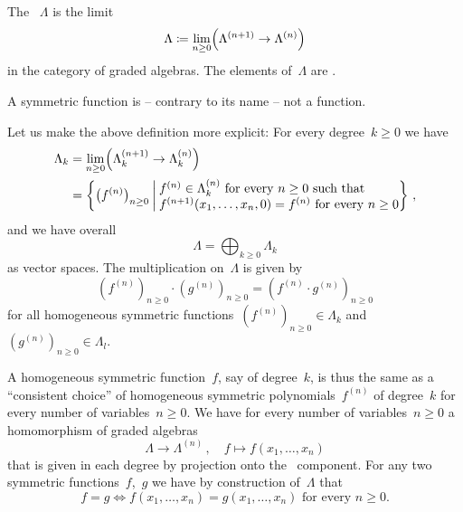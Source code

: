 \documentclass[a4paper,11pt]{scrartcl}
\begin{document}
\begin{definition}
  The ~$\Lambda$ is the limit
  \[
    \Lambda
    \coloneqq
    \lim_{n \geq 0}
    \Bigl( \Lambda^{(n+1)} \to \Lambda^{(n)} \Bigr)
  \]
  in the category of graded algebras.
  The elements of~$\Lambda$ are .
\end{definition}

\begin{warning}
  A symmetric function is -- contrary to its name -- not a function.
\end{warning}

Let us make the above definition more explicit:
For every degree~$k \geq 0$ we have
\begin{align*}
  \Lambda_k
  &=
  \lim_{n \geq 0}
  \Bigl( \Lambda^{(n+1)}_k \to \Lambda^{(n)}_k \Bigr)
  \\
  &=
  \left\{
    \bigl( f^{(n)} \bigr)_{n \geq 0}
    \suchthat*
    \begin{tabular}{@{}l@{}}
      $f^{(n)} \in \Lambda^{(n)}_k$ for every~$n \geq 0$ such that \\
      $f^{(n+1)}(x_1, \dotsc, x_n, 0) = f^{(n)}$ for every~$n \geq 0$
    \end{tabular}
  \right\} \,,
\end{align*}
and we have overall
\[
  \Lambda
  =
  \bigoplus_{k \geq 0} \Lambda_k
\]
as vector spaces.
The multiplication on~$\Lambda$ is given by
\[
  (f^{(n)})_{n \geq 0}
  \cdot
  (g^{(n)})_{n \geq 0}
  =
  (f^{(n)} \cdot g^{(n)})_{n \geq 0}
\]
for all homogeneous symmetric functions~$(f^{(n)})_{n \geq 0} \in \Lambda_k$ and~$(g^{(n)})_{n \geq 0} \in \Lambda_l$.

A homogeneous symmetric function~$f$, say of degree~$k$, is thus the same as a \enquote{consistent choice} of homogeneous symmetric polynomials~$f^{(n)}$ of degree~$k$ for every number of variables~$n \geq 0$.
We have for every number of variables~$n \geq 0$ a homomorphism of graded algebras
\[
  \Lambda
  \to
  \Lambda^{(n)} \,,
  \quad
  f
  \mapsto
  f(x_1, \dotsc, x_n)
\]
that is given in each degree by projection onto the~ component.
For any two symmetric functions~$f$,~$g$ we have by construction of~$\Lambda$ that
\[
  f = g
  \iff
  \text{$f(x_1, \dotsc, x_n) = g(x_1, \dotsc, x_n)$ for every~$n \geq 0$.}
\]
\end{document}
